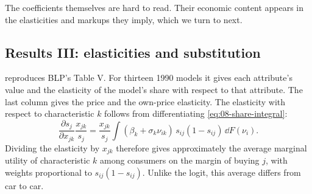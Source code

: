 The coefficients themselves are hard to read. Their economic content appears in the elasticities and
markups they imply, which we turn to next.

\subsection{Results III: elasticities and substitution}\label{sec:08-blp95-elas}

 reproduces BLP's Table V. For thirteen 1990 models it gives each attribute's
value and the elasticity of the model's share with respect to that attribute. The last column gives the
price and the own-price elasticity. The elasticity with respect to characteristic $k$ follows from
differentiating \eqref{eq:08-share-integral}:
\begin{equation}\label{eq:08-blp-attrelas}
\frac{\partial s_j}{\partial x_{jk}}\frac{x_{jk}}{s_j}
 =\frac{x_{jk}}{s_j}\int(\beta_k+\sigma_k\nu_{ik})\,s_{ij}(1-s_{ij})\,\dd F(\nu_i).
\end{equation}
Dividing the elasticity by $x_{jk}$ therefore gives approximately the average marginal utility of
characteristic $k$ among consumers on the margin of buying $j$, with weights proportional to
$s_{ij}(1-s_{ij})$. Unlike the logit, this average differs from car to car.

